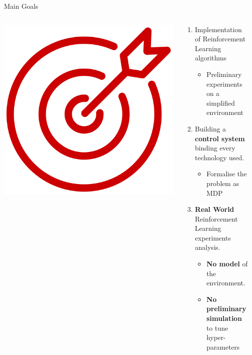 \documentclass[aspectratio=169]{beamer}
\begin{document}
\begin{frame}{Main Goals}
	\begin{columns}
		\begin{column}{0.4\linewidth}
			\centering
			\includegraphics[width=0.6\linewidth]{img/goal.png}
		\end{column}
		\begin{column}{0.6\linewidth}
			\begin{enumerate}%
				\item{Implementation of Reinforcement Learning algorithms}
				\begin{itemize}
					\item{Preliminary experiments on a simplified environment}
				\end{itemize}
				\item{Building a \textbf{control system} binding every technology used.}
				\begin{itemize}
					\item{Formalise the problem as MDP}
				\end{itemize}
				\item \textbf{Real World} Reinforcement Learning experiments analysis.
				\begin{itemize}
					\item\textbf{No model} of the environment.
					\item\textbf{No preliminary simulation} to tune hyper-parameters
				\end{itemize}
			\end{enumerate}
		\end{column}
	\end{columns}
\end{frame}
\end{document}
